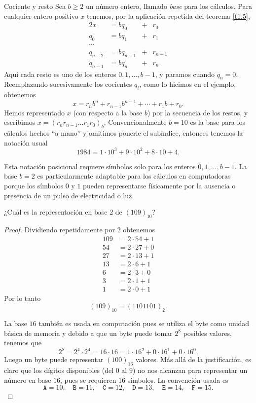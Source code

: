 \begin{section}{Cociente y resto}
Sea $b \ge 2$ un número entero, llamado \textit{base} para los cálculos.
Para cualquier entero positivo $x$ tenemos, por la aplicación
repetida del teorema \ref{t1.5},
\begin{alignat*}2
x&=bq_0 &+& r_0 \\
q_0 & = bq_1 &+&r_1 \\
\cdots & \\
q_{n-2} & = bq_{n-1} &+&r_{n-1} \\
q_{n-1} & = bq_n &+&r_n.
\end{alignat*}
Aquí cada resto es uno de los enteros $0, 1,\ldots,b-1$, y paramos
cuando $q_n=0$. Reemplazando sucesivamente los cocientes $q_i$, como lo hicimos en el ejemplo, obtenemos
$$
x=r_nb^n +r_{n-1} b^{n-1}+\cdots + r_1 b + r_0.
$$
Hemos representado $x$ (con respecto a la base $b$) por la
secuencia de los restos, y escribimos $x=(r_nr_{n-1}\dots r_1
r_0)_b$. Convencionalmente $b=10$ es la base para los cálculos
hechos ``a mano'' y omitimos ponerle el subíndice, entonces
tenemos la notación usual
$$
1984= 1\cdot 10^3  + 9\cdot 10^2 + 8\cdot 10 + 4.
$$

Esta notación posicional requiere símbolos solo para los enteros
$0, 1,\ldots,b-1$. La base $b=2$ es particularmente adaptable para
los cálculos en computadoras porque los símbolos $0$ y $1$ pueden
representarse físicamente por la ausencia o presencia de un pulso
de electricidad o luz. 

\begin{ejemplo*} ¿Cuál es la representación en base $2$ de
$(109)_{10}$?
\end{ejemplo*}
\begin{proof} Dividiendo repetidamente por $2$ obtenemos
$$\begin{aligned}
109&=2\cdot 54+1\\ 54&=2\cdot 27+0\\ 27&=2\cdot 13+1\\ 13&=2\cdot 6+1\\
6&=2\cdot 3+0 \\ 3&=2\cdot 1+1 \\1&=2\cdot 0+1
\end{aligned}
$$
Por lo tanto
$$ (109)_{10} = (1101101)_2.
$$

La base $16$ también es usada en computación pues se utiliza el byte como unidad básica de memoria y debido a que un byte puede tomar
$2^8$ posibles valores, tenemos que $$2^8 = 2^4 \cdot 2^4 = 16 \cdot 16 = 1 \cdot 16^2 + 0 \cdot 16^1 + 0 \cdot 16^0.$$ Luego 
 un byte puede representar $(100)_{16}$ valores. Más allá de la justificación, es claro que los dígitos disponibles (del $0$  al $9$) no nos alcanzan  para representar un  número en base $16$, pues se requieren $16$ símbolos. La convención usada es 
 $$\texttt{A}=10,\quad \texttt{B}=11,\quad \texttt{C} =12,\quad \texttt{D} = 13,\quad \texttt{E} = 14,\quad \texttt{F} = 15.$$


\end{proof}
\end{section}

